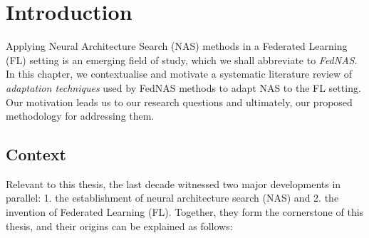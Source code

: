 \chapter{Introduction}\label{chapter:introduction}

Applying Neural Architecture Search (NAS) methods in a Federated Learning (FL) setting is an emerging field of study, which we shall abbreviate to \textit{FedNAS}. In this chapter, we contextualise and motivate a systematic literature review of \textit{adaptation techniques} used by FedNAS methods to adapt NAS to the FL setting. Our motivation leads us to our research questions and ultimately, our proposed methodology for addressing them.

\section{Context}

Relevant to this thesis, the last decade witnessed two major developments in parallel: 1. the establishment of neural architecture search (NAS) and 2. the invention of Federated Learning (FL). Together, they form the cornerstone of this thesis, and their origins can be explained as follows:

